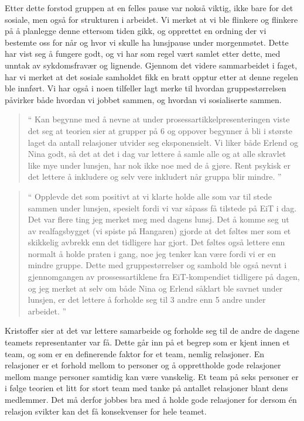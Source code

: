 Etter dette forstod gruppen at en felles pause var nokså viktig, ikke bare for det sosiale, men også for strukturen i arbeidet. Vi merket at vi ble flinkere og flinkere på å planlegge denne ettersom tiden gikk, og opprettet en ordning der vi bestemte oss for når og hvor vi skulle ha lunsjpause under morgenmøtet. Dette har vist seg å fungere godt, og vi har som regel vært samlet etter dette, med unntak av sykdomsfravær og lignende. Gjennom det videre sammarbeidet i faget, har vi merket at det sosiale samholdet fikk en bratt opptur etter at denne regelen ble innført. Vi har også i noen tilfeller lagt merke til hvordan gruppestørrelsen påvirker både hvordan vi jobbet sammen, og hvordan vi sosialiserte sammen. 

\begin{quote}``
Kan begynne med å nevne at under prosessartikkelpresenteringen viste det seg at teorien sier at grupper på 6 og oppover begynner å bli i største laget da antall relasjoner utvider seg eksponensielt. Vi liker både Erlend og Nina godt, så det at det i dag var lettere å samle alle og at alle skravlet like mye under lunsjen, har nok ikke noe med de å gjøre. Rent psykisk er det lettere å inkludere og selv vere inkludert når gruppa blir mindre.
''\end{quote} 

\begin{quote}``
Opplevde det som positivt at vi klarte holde alle som var til stede sammen under lunsjen, spesielt fordi vi var såpass få tilstede på EiT i dag. Det var flere ting jeg merket meg med dagens lunsj. Det å komme seg ut av realfagsbygget (vi spiste på Hangaren) gjorde at det føltes mer som et skikkelig avbrekk enn det tidligere har gjort. Det føltes også lettere enn normalt å holde praten i gang, noe jeg tenker kan være fordi vi er en mindre gruppe. Dette med gruppestørrelser og samhold ble også nevnt i gjennomgangen av prossessartiklene fra EiT-kompendiet tidligere på dagen, og jeg merket at selv om både Nina og Erlend såklart ble savnet under lunsjen, er det lettere å forholde seg til 3 andre enn 5 andre under arbeidet.
''\end{quote} 

Kristoffer sier at det var lettere samarbeide og forholde seg til de andre de dagene teamets representanter var få. 
Dette går inn på et begrep som er kjent innen et team, og som er en definerende faktor for et team, nemlig relasjoner. 
En relasjoner er et forhold mellom to personer og å opprettholde gode relasjoner mellom mange personer samtidig
kan være vanskelig. Et team på seks personer er i følge teorien  \cite{Artikkel4} et litt for stort team med tanke på antallet relasjoner
blant dens medlemmer. Det må derfor jobbes bra med å holde gode relasjoner for dersom én relasjon svikter kan det få 
konsekvenser for hele teamet. 

